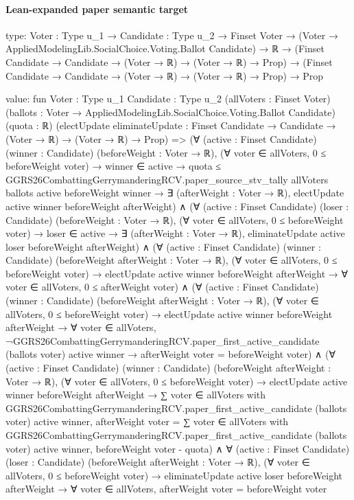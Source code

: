 \documentclass[10pt]{article}
\begin{document}
\paragraph{Lean-expanded paper semantic target}
\begin{ReviewVerbatim}
type:
{Voter : Type u_1} →
  {Candidate : Type u_2} →
    Finset Voter →
      (Voter → AppliedModelingLib.SocialChoice.Voting.Ballot Candidate) →
        ℝ →
          (Finset Candidate → Candidate → (Voter → ℝ) → (Voter → ℝ) → Prop) →
            (Finset Candidate → Candidate → (Voter → ℝ) → (Voter → ℝ) → Prop) → Prop

value:
fun {Voter : Type u_1} {Candidate : Type u_2} (allVoters : Finset Voter)
    (ballots : Voter → AppliedModelingLib.SocialChoice.Voting.Ballot Candidate) (quota : ℝ)
    (electUpdate eliminateUpdate : Finset Candidate → Candidate → (Voter → ℝ) → (Voter → ℝ) → Prop) =>
  (∀ (active : Finset Candidate) (winner : Candidate) (beforeWeight : Voter → ℝ),
      (∀ voter ∈ allVoters, 0 ≤ beforeWeight voter) →
        winner ∈ active →
          quota ≤
              GGRS26CombattingGerrymanderingRCV.paper_source_stv_tally allVoters ballots active beforeWeight winner →
            ∃ (afterWeight : Voter → ℝ), electUpdate active winner beforeWeight afterWeight) ∧
    (∀ (active : Finset Candidate) (loser : Candidate) (beforeWeight : Voter → ℝ),
        (∀ voter ∈ allVoters, 0 ≤ beforeWeight voter) →
          loser ∈ active → ∃ (afterWeight : Voter → ℝ), eliminateUpdate active loser beforeWeight afterWeight) ∧
      (∀ (active : Finset Candidate) (winner : Candidate) (beforeWeight afterWeight : Voter → ℝ),
          (∀ voter ∈ allVoters, 0 ≤ beforeWeight voter) →
            electUpdate active winner beforeWeight afterWeight → ∀ voter ∈ allVoters, 0 ≤ afterWeight voter) ∧
        (∀ (active : Finset Candidate) (winner : Candidate) (beforeWeight afterWeight : Voter → ℝ),
            (∀ voter ∈ allVoters, 0 ≤ beforeWeight voter) →
              electUpdate active winner beforeWeight afterWeight →
                ∀ voter ∈ allVoters,
                  ¬GGRS26CombattingGerrymanderingRCV.paper_first_active_candidate (ballots voter) active winner →
                    afterWeight voter = beforeWeight voter) ∧
          (∀ (active : Finset Candidate) (winner : Candidate) (beforeWeight afterWeight : Voter → ℝ),
              (∀ voter ∈ allVoters, 0 ≤ beforeWeight voter) →
                electUpdate active winner beforeWeight afterWeight →
                  ∑ voter ∈ allVoters with
                      GGRS26CombattingGerrymanderingRCV.paper_first_active_candidate (ballots voter) active winner,
                      afterWeight voter =
                    ∑ voter ∈ allVoters with
                        GGRS26CombattingGerrymanderingRCV.paper_first_active_candidate (ballots voter) active winner,
                        beforeWeight voter -
                      quota) ∧
            ∀ (active : Finset Candidate) (loser : Candidate) (beforeWeight afterWeight : Voter → ℝ),
              (∀ voter ∈ allVoters, 0 ≤ beforeWeight voter) →
                eliminateUpdate active loser beforeWeight afterWeight →
                  ∀ voter ∈ allVoters, afterWeight voter = beforeWeight voter
\end{ReviewVerbatim}
\end{document}

